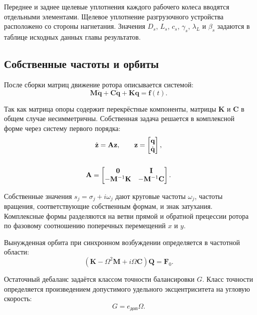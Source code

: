 Переднее и заднее щелевые уплотнения каждого рабочего колеса вводятся отдельными элементами. Щелевое уплотнение разгрузочного устройства расположено со стороны нагнетания. Значения $D_s$, $L_s$, $c_s$, $\gamma_s$, $\lambda_L$ и $\beta_s$ задаются в таблице исходных данных главы результатов.

\subsection{Собственные частоты и орбиты}

После сборки матриц движение ротора описывается системой:
\begin{equation}
    \mathbf{M}\ddot{\mathbf{q}}+\mathbf{C}\dot{\mathbf{q}}+\mathbf{K}\mathbf{q}=\mathbf{f}(t).
    \label{eq:rotor_motion}
\end{equation}

Так как матрица опоры содержит перекрёстные компоненты, матрицы $\mathbf{K}$ и $\mathbf{C}$ в общем случае несимметричны. Собственная задача решается в комплексной форме через систему первого порядка:
\begin{gather}
\dot{\mathbf{z}}=\mathbf{A}\mathbf{z},\qquad
    \mathbf{z}=\begin{bmatrix}\mathbf{q}\\\dot{\mathbf{q}}\end{bmatrix},\\[\baselineskip]
\mathbf{A}=\begin{bmatrix}
    \mathbf{0}&\mathbf{I}\\
    -\mathbf{M}^{-1}\mathbf{K}&-\mathbf{M}^{-1}\mathbf{C}
    \end{bmatrix}.
    \label{eq:first_order_matrix}
\end{gather}

Собственные значения $s_j=\sigma_j+i\omega_j$ дают круговые частоты $\omega_j$, частоты вращения, соответствующие собственным формам, и знак затухания. Комплексные формы разделяются на ветви прямой и обратной прецессии ротора по фазовому соотношению поперечных перемещений $x$ и $y$.

Вынужденная орбита при синхронном возбуждении определяется в частотной области:
\begin{equation}
    \left(\mathbf{K}-\Omega^2\mathbf{M}+i\Omega\mathbf{C}\right)\mathbf{Q}=\mathbf{F}_0.
    \label{eq:frequency_response}
\end{equation}

Остаточный дебаланс задаётся классом точности балансировки $G$. Класс точности определяется произведением допустимого удельного эксцентриситета на угловую скорость:
\begin{equation}
    G=e_{\text{доп}}\Omega.
\end{equation}

